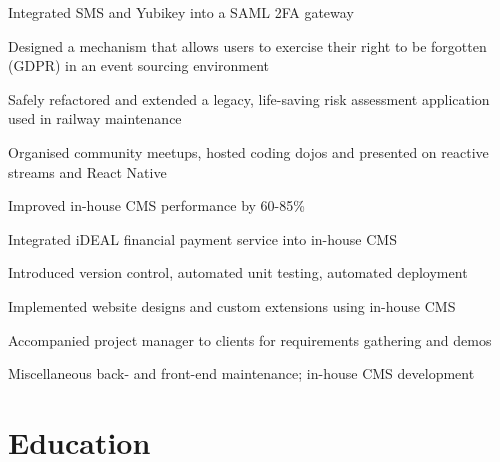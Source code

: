 \documentclass[a4paper,10pt]{article}
\begin{document}
            \begin{resume_list}
              \item Integrated SMS and Yubikey into a SAML 2FA gateway
              \item Designed a mechanism that allows users to exercise their right to be forgotten (GDPR) in an event sourcing environment
              \item Safely refactored and extended a legacy, life-saving risk assessment application used in railway maintenance
              \item Organised community meetups, hosted coding dojos and presented on reactive streams and React Native
            \end{resume_list}


            \begin{resume_list}
              \item Improved in-house CMS performance by 60-85\%
              \item Integrated iDEAL financial payment service into in-house CMS
              \item Introduced version control, automated unit testing, automated deployment
              \item Implemented website designs and custom extensions using in-house CMS
              \item Accompanied project manager to clients for requirements gathering and demos
            \end{resume_list}


            \begin{resume_list}
              \item Miscellaneous back- and front-end maintenance; in-house CMS development
            \end{resume_list}


          \section{Education}
\end{document}
